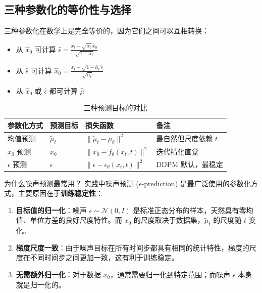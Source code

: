 \documentclass[a4paper]{article}
\begin{document}
\subsection{三种参数化的等价性与选择}

三种参数化在数学上是完全等价的，因为它们之间可以互相转换：

\begin{itemize}
    \item 从 $\hat{x}_0$ 可计算 $\hat{\epsilon} = \frac{x_t - \sqrt{\bar{\alpha}_t}\, \hat{x}_0}{\sqrt{1-\bar{\alpha}_t}}$
    \item 从 $\hat{\epsilon}$ 可计算 $\hat{x}_0 = \frac{x_t - \sqrt{1-\bar{\alpha}_t}\, \hat{\epsilon}}{\sqrt{\bar{\alpha}_t}}$
    \item 从 $\hat{x}_0$ 或 $\hat{\epsilon}$ 都可计算 $\hat{\mu}$
\end{itemize}

\begin{table}[H]
\centering
\caption{三种预测目标的对比}
\begin{tabular}{llll}
\toprule
\textbf{参数化方式} & \textbf{预测目标} & \textbf{损失函数} & \textbf{备注} \\
\midrule
均值预测 & $\tilde{\mu}_t$ & $\|\tilde{\mu}_t - \mu_\theta\|^2$ & 最自然但尺度依赖 $t$ \\
$x_0$ 预测 & $x_0$ & $\|x_0 - f_\theta(x_t,t)\|^2$ & 迭代精化直觉 \\
$\epsilon$ 预测 & $\epsilon$ & $\|\epsilon - \epsilon_\theta(x_t,t)\|^2$ & DDPM 默认，最稳定 \\
\bottomrule
\end{tabular}
\end{table}

\begin{importantbox}{为什么噪声预测最常用？}
实践中噪声预测 ($\epsilon$-prediction) 是最广泛使用的参数化方式，主要原因在于\textbf{训练稳定性}：
\begin{enumerate}
    \item \textbf{目标值的归一化}：噪声 $\epsilon \sim \mathcal{N}(0,I)$ 是标准正态分布的样本，天然具有零均值、单位方差的良好尺度特性。而 $x_0$ 的尺度取决于数据集，$\tilde{\mu}_t$ 的尺度随 $t$ 变化。
    \item \textbf{梯度尺度一致}：由于噪声目标在所有时间步都具有相同的统计特性，梯度的尺度在不同时间步之间更加一致，这有利于训练稳定。
    \item \textbf{无需额外归一化}：对于数据 $x_0$，通常需要归一化到特定范围；而噪声 $\epsilon$ 本身就是归一化的。
\end{enumerate}
\end{importantbox}
\end{document}
